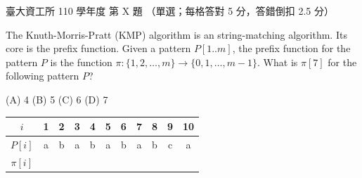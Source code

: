 \begin{pastexam}[label={px:ntu-110-dsaa-10}]{臺大資工所 110 學年度 第 X 題}
（單選；每格答對 5 分，答錯倒扣 2.5 分）

The Knuth-Morris-Pratt (KMP) algorithm is an string-matching algorithm. Its core is the prefix
function. Given a pattern $P[1..m]$, the prefix function for the pattern $P$ is the function
$\pi:\{1,2,\ldots,m\}\to\{0,1,\ldots,m-1\}$. What is $\pi[7]$ for the following pattern $P$?
\underline{}

(A) 4 \qquad (B) 5 \qquad (C) 6 \qquad (D) 7
\begin{center}
\begin{tabular}{c|c|c|c|c|c|c|c|c|c|c}
$i$ & 1 & 2 & 3 & 4 & 5 & 6 & 7 & 8 & 9 & 10 \\ \hline
$P[i]$ & a & b & a & b & a & b & a & b & c & a \\ \hline
$\pi[i]$ & & & & & & & & & & \\
\end{tabular}
\end{center}
\end{pastexam}

